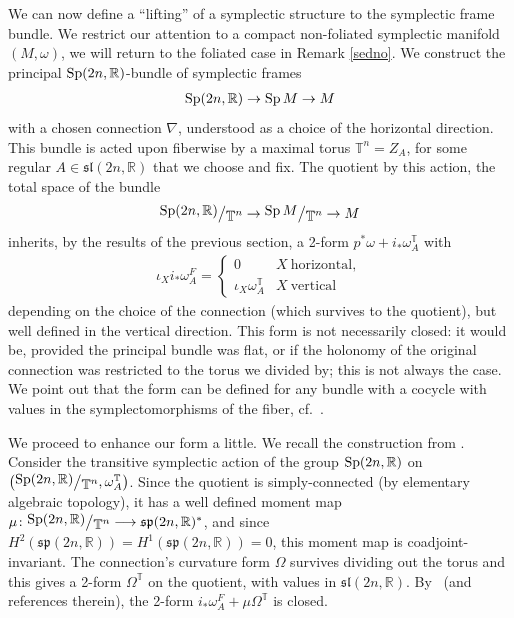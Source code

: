 \documentclass[pdftex]{sigma}
\numberwithin{equation}{section}
\newcommand{\bigslant}[2]{{\raisebox{.2em}{$#1$}\big/\raisebox{-.2em}{$#2$}}}
\begin{document}
We can now define a ``lifting'' of a symplectic structure to the symplectic frame bundle. We restrict our attention to a compact non-foliated symplectic manifold $(M,\omega)$, we will return to the foliated case in Remark \ref{sedno}. We construct the principal ${\rm Sp}(2n,\mathbb{R})$-bundle of symplectic frames
\begin{gather*}
{\rm Sp}(2n,\mathbb{R}) \to \operatorname{Sp} M \to M
\end{gather*}
with a chosen connection $\nabla$, understood as a choice of the horizontal direction. This bundle is acted upon fiberwise by a maximal torus $\mathbb{T}^n=Z_A$, for some regular $A\in\mathfrak{sl}(2n,\mathbb{R})$ that we choose and fix. The quotient by this action, the total space of the bundle
\begin{gather*}
\bigslant{{\rm Sp}(2n,\mathbb{R})}{\mathbb{T}^n} \to \bigslant{\operatorname{Sp} M}{\mathbb{T}^n} \to M
\end{gather*}
inherits, by the results of the previous section, a 2-form $p^*\omega+i_*\omega^{\mathbb{T}}_A$ with
\begin{gather*}
\iota_X i_*\omega^F_A=\begin{cases} 0 & X \ \text{horizontal},\\
\iota_X\omega^{\mathbb{T}}_A & X \ \text{vertical}\end{cases}
\end{gather*}
depending on the choice of the connection (which survives to the quotient), but well defined in the vertical direction. This form is not necessarily closed: it would be, provided the principal bundle was flat, or if the holonomy of the original connection was restricted to the torus we divided by; this is not always the case. We point out that the form can be defined for any bundle with a cocycle with values in the symplectomorphisms of the fiber, cf.~\cite{dusa}.

We proceed to enhance our form a little. We recall the construction from \cite{fat}. Consider the transitive symplectic action of the group ${\rm Sp}(2n,\mathbb{R})$ on $\big(\bigslant{{\rm Sp}(2n,\mathbb{R})}{\mathbb{T}^n},\omega^{\mathbb{T}}_A\big)$. Since the quotient is simply-connected (by elementary algebraic topology), it has a well defined moment map $\mu\colon \bigslant{{\rm Sp}(2n,\mathbb{R})}{\mathbb{T}^n}\longrightarrow \mathfrak{sp}(2n,\mathbb{R})^*$, and since $H^2(\mathfrak{sp}(2n,\mathbb{R}))=H^1(\mathfrak{sp}(2n,\mathbb{R}))=0$, this moment map is coadjoint-invariant. The connection's curvature form $\Omega$ survives dividing out the torus and this gives a 2-form $\Omega^{\mathbb{T}}$ on the quotient, with values in $\mathfrak{sl}(2n,\mathbb{R})$. By~\cite{fat} (and references therein), the 2-form $i_*\omega^F_A + \mu\Omega^{\mathbb{T}}$ is closed.
\end{document}
